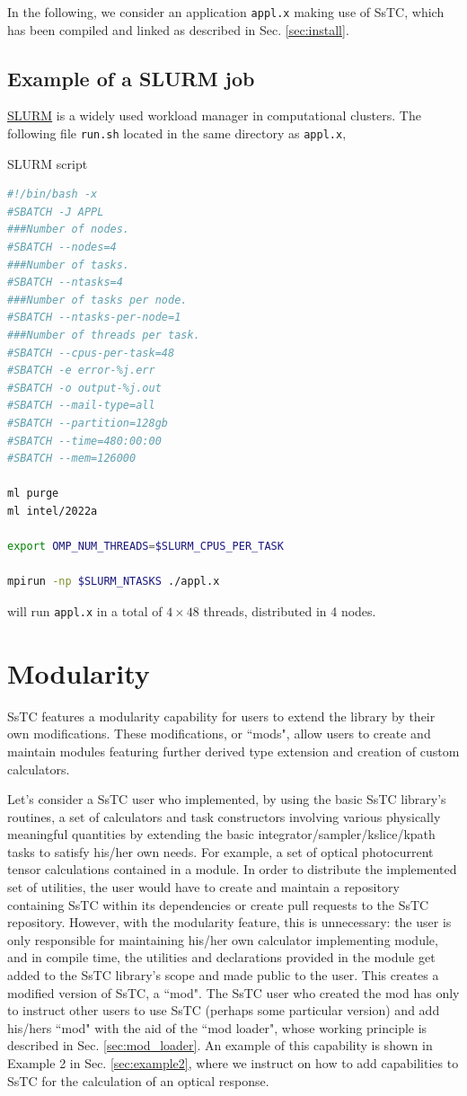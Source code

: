 \documentclass[10pt,a4paper]{article}
\begin{document}
In the following, we consider an application \verb|appl.x| making use of SsTC, which has been compiled and linked as described in Sec. \ref{sec:install}.
\subsection{Example of a SLURM job}
\href{https://slurm.schedmd.com/documentation.html}{SLURM} is a widely used workload manager in computational clusters. The following file \verb|run.sh| located in the same directory as \verb|appl.x|,
\begin{codebox}{SLURM script}
\begin{lstlisting}[language=bash, caption={SLURM script ``run".},captionpos=b]
#!/bin/bash -x
#SBATCH -J APPL
###Number of nodes.
#SBATCH --nodes=4
###Number of tasks.
#SBATCH --ntasks=4
###Number of tasks per node.
#SBATCH --ntasks-per-node=1
###Number of threads per task.
#SBATCH --cpus-per-task=48
#SBATCH -e error-%j.err
#SBATCH -o output-%j.out
#SBATCH --mail-type=all
#SBATCH --partition=128gb
#SBATCH --time=480:00:00
#SBATCH --mem=126000

ml purge
ml intel/2022a

export OMP_NUM_THREADS=$SLURM_CPUS_PER_TASK

mpirun -np $SLURM_NTASKS ./appl.x
\end{lstlisting}
\end{codebox}
will run \verb|appl.x| in a total of $4\times 48$ threads, distributed in 4 nodes.
\section{Modularity}\label{sec:modularity}
SsTC features a modularity capability for users to extend the library by their own modifications. These modifications, or ``mods", allow users to create and maintain modules featuring further derived type extension and creation of custom calculators.

Let’s consider a SsTC user who implemented, by using the basic SsTC library's routines, a set of calculators and task constructors involving various physically meaningful quantities by extending the basic integrator/sampler/kslice/kpath tasks to satisfy his/her own needs. For example, a set of optical photocurrent tensor calculations contained in a module. In order to distribute the implemented set of utilities, the user would have to create and maintain a repository containing SsTC within its dependencies or create pull requests to the SsTC repository. However, with the modularity feature, this is unnecessary: the user is only responsible for maintaining his/her own calculator implementing module, and in compile time, the utilities and declarations provided in the module get added to the SsTC library's scope and made public to the user. This creates a modified version of SsTC, a ``mod". The SsTC user who created the mod has only to instruct other users to use SsTC (perhaps some particular version) and add his/hers ``mod" with the aid of the ``mod loader", whose working principle is described in Sec. \ref{sec:mod_loader}. An example of this capability is shown in Example 2 in Sec. \ref{sec:example2}, where we instruct on how to add capabilities to SsTC for the calculation of an optical response.
\end{document}
